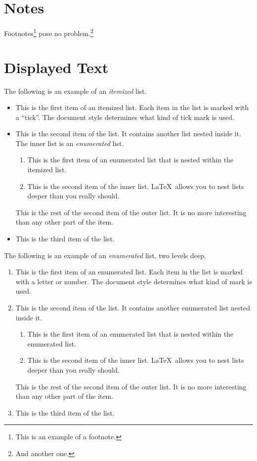 \documentclass{river-journal}
\begin{document}
\section{Notes}
Footnotes\footnote{This is an example of a footnote.}
pose no problem.\footnote{And another one.}


\section{Displayed Text}

The following is an example of an {\em itemized} list.
\begin{itemize}
\item  This is the first item of an itemized list.  Each item
      in the list is marked with a ``tick''.  The document
      style determines what kind of tick mark is used.
\item  This is the second item of the list.  It contains another
      list nested inside it.  The inner list is an {\em enumerated}
      list.
    \begin{enumerate}
       \item This is the first item of an enumerated list that
            is nested within the itemized list.
          \item This is the second item of the inner list.  \LaTeX\
            allows you to nest lists deeper than you really should.
      \end{enumerate}
      This is the rest of the second item of the outer list.  It
      is no more interesting than any other part of the item.
   \item  This is the third item of the list.
\end{itemize}


The following is an example of an {\em enumerated} list, two levels deep.
\begin{enumerate}
\item  This is the first item of an enumerated list.  Each item
      in the list is marked with a letter or number.  The document
      style determines what kind of mark is used.
\item  This is the second item of the list.  It contains another
      enumerated list nested inside it.
    \begin{enumerate}
       \item This is the first item of an enumerated list that
            is nested within the enumerated list.
          \item This is the second item of the inner list.  \LaTeX\
            allows you to nest lists deeper than you really should.
      \end{enumerate}
      This is the rest of the second item of the outer list.  It
      is no more interesting than any other part of the item.
   \item  This is the third item of the list.
\end{enumerate}
\end{document}
